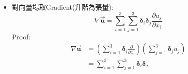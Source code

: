 \documentclass[../main.tex]{subfiles}
\begin{document}
\begin{itemize}
\begin{itemize}
\begin{equation}
{          \varepsilon_{ijk} \bm \delta_k \frac{\partial u_j}{\partial x_i}}
        \end{equation}
        Proof:
        \begin{align}
          \left[\nabla \times \vec {\bm u} \right] &
          = \left[
            \left(
              \sum_{i=1}^3 \bm \delta_i \frac{\partial}{\partial x_i}
            \right) \times 
            \left(
              \sum_{j=1}^3 \bm \delta_j u_j
            \right)
          \right] \nonumber\\
          &= \sum_{i=1}^3 \sum_{j=1}^3 \left(
            \bm \delta_i \times \bm \delta_j
          \right) \frac{\partial}{\partial x_i} u_j \nonumber\\
          &= \sum_{i=1}^3 \sum_{j=1}^3 \sum_{k=1}^3
          \varepsilon_{ijk} \bm \delta_k \frac{\partial u_j}{\partial x_i}
        \end{align}
        不存在交換律、結合律
        \begin{equation}
          \boxed{\nabla \times \vec {\bm u} \neq \vec {\bm u} \times \nabla} \quad 
          \boxed{\nabla \times (f \vec {\bm u}) \neq (\nabla f) \times \vec {\bm u}}
        \end{equation}
        P.S. 若展開則跟前面(\ref{eq:curl_definition})式相同
        \begin{equation}
          \nabla \times \vec {\bm u} = \begin{vmatrix}
            \bm \delta_x & \bm \delta_y & \bm \delta_z \\
            \frac{\partial}{\partial x} & \frac{\partial}{\partial y} & \frac{\partial}{\partial z} \\
            u_x & u_y & u_z
          \end{vmatrix}
        \end{equation}
      \item 對向量場取Gradient(升階為張量):
        \begin{equation}
          \boxed{\nabla \vec {\bm u} = \sum_{i=1}^3 \sum_{j=1}^3 \bm \delta_i \bm \delta_j \frac{\partial u_j}{\partial x_i}}
        \end{equation}
        Proof:
        \begin{align}
          \nabla \vec {\bm u} &=
          \left(
            \sum_{i=1}^3 \bm \delta_i \frac{\partial}{\partial x_i}
          \right) 
          \left(
            \sum_{j=1}^3 \bm \delta_j u_j
          \right) \nonumber\\
          &= \sum_{i=1}^3 \sum_{j=1}^3 \bm \delta_i \bm \delta_j

\end{align}
\end{itemize}
\end{itemize}
\end{document}
